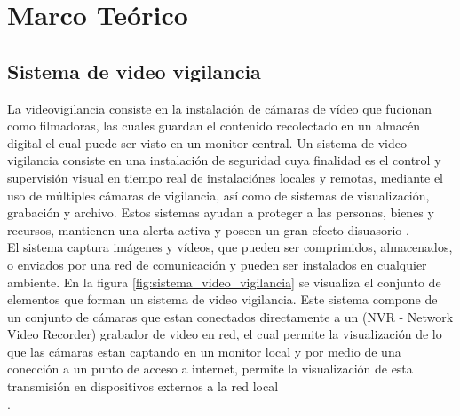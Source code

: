 \chapter{Marco Teórico}


\section{Sistema de video vigilancia}
La videovigilancia consiste en la instalación de cámaras de vídeo que fucionan como filmadoras, las cuales guardan el contenido recolectado en un almacén digital el cual puede ser visto en un monitor central. Un sistema de video vigilancia consiste en una instalación de seguridad cuya finalidad es el control y supervisión visual en tiempo real de instalaciónes locales y remotas, mediante el uso de múltiples cámaras de vigilancia, así como de sistemas de visualización, grabación y archivo. Estos sistemas ayudan a proteger a las personas, bienes y recursos, mantienen una alerta activa y poseen un gran efecto disuasorio \cite{wikipedia:vvigilancia}.\\

El sistema captura imágenes y vídeos, que pueden ser comprimidos, almacenados, o enviados por una red de comunicación y pueden ser instalados en cualquier ambiente. En la figura \ref{fig:sistema_video_vigilancia} se visualiza el conjunto de elementos que forman un sistema de video vigilancia. Este sistema compone de un conjunto de cámaras que estan conectados directamente a un (NVR - Network Video Recorder) grabador de video en red, el cual permite la visualización de lo que las cámaras estan captando en un monitor local y por medio de una conección a un punto de acceso a internet, permite la visualización de esta transmisión en dispositivos externos a la red local\\.

